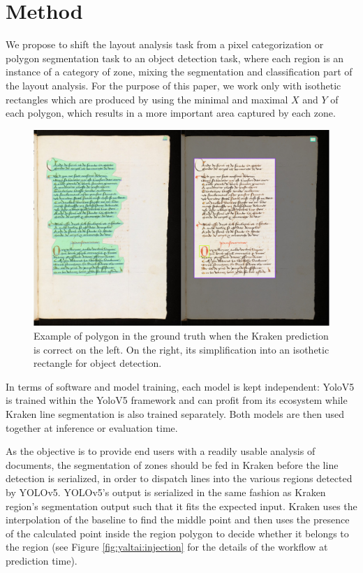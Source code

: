 \documentclass{jdmdh}
\begin{document}

\section{Method}

We propose to shift the layout analysis task from a pixel categorization or polygon segmentation task to an object detection task, where each region is an instance of a category of zone, mixing the segmentation and classification part of the layout analysis. For the purpose of this paper, we work only with isothetic rectangles which are produced by using the minimal and maximal $X$ and $Y$ of each polygon, which results in a more important area captured by each zone. 

\begin{figure}
    \centering
    \includegraphics[width=.5\linewidth]{images/rectangulisation.jpg}
    \caption{Example of polygon in the ground truth when the Kraken prediction is correct on the left. On the right, its simplification into an isothetic rectangle for object detection.}
    \label{fig:yaltai:rectangulisation}
\end{figure}

In terms of software and model training, each model is kept independent: YoloV5 is trained within the YoloV5 framework and can profit from its ecosystem while Kraken line segmentation is also trained separately. Both models are then used together at inference or evaluation time.

As the objective is to provide end users with a readily usable analysis of documents, the segmentation of zones should be fed in Kraken before the line detection is serialized, in order to dispatch lines into the various regions detected by YOLOv5. YOLOv5's output is serialized in the same fashion as Kraken region's segmentation output such that it fits the expected input. Kraken uses the interpolation of the baseline to find the middle point and then uses the presence of the calculated point inside the region polygon to decide whether it belongs to the region (see Figure \ref{fig:yaltai:injection} for the details of the workflow at prediction time).
\end{document}
